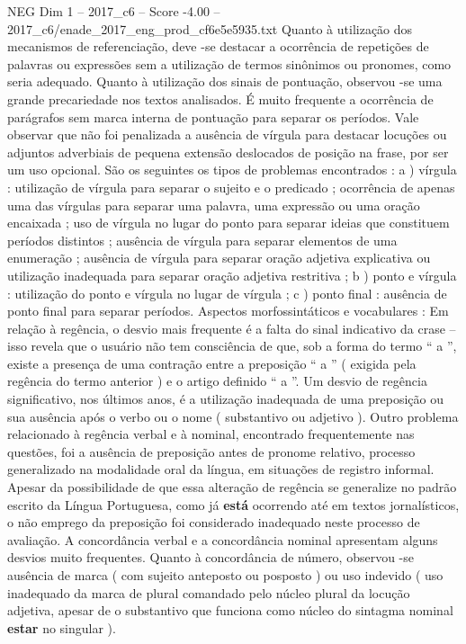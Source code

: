 \begin{textsample}{NEG Dim 1 – 2017\_c6 – Score -4.00 – 2017\_c6/enade\_2017\_eng\_prod\_cf6e5e5935.txt}
Quanto à utilização dos mecanismos de referenciação, deve -se destacar a ocorrência de repetições de palavras ou expressões sem a utilização de termos sinônimos ou pronomes, como seria adequado.
Quanto à utilização dos sinais de pontuação, observou -se uma grande precariedade nos textos analisados.
É muito frequente a ocorrência de parágrafos sem marca interna de pontuação para separar os períodos.
Vale observar que não foi penalizada a ausência de vírgula para destacar locuções ou adjuntos adverbiais de pequena extensão deslocados de posição na frase, por ser um uso opcional.
São os seguintes os tipos de problemas encontrados : a ) vírgula : utilização de vírgula para separar o sujeito e o predicado ; ocorrência de apenas uma das vírgulas para separar uma palavra, uma expressão ou uma oração encaixada ; uso de vírgula no lugar do ponto para separar ideias que constituem períodos distintos ; ausência de vírgula para separar elementos de uma enumeração ; ausência de vírgula para separar oração adjetiva explicativa ou utilização inadequada para separar oração adjetiva restritiva ; b ) ponto e vírgula : utilização do ponto e vírgula no lugar de vírgula ; c ) ponto final : ausência de ponto final para separar períodos.
Aspectos morfossintáticos e vocabulares : Em relação à regência, o desvio mais frequente é a falta do sinal indicativo da crase – isso revela que o usuário não tem consciência de que, sob a forma do termo “ a ”, existe a presença de uma contração entre a preposição “ a ” ( exigida pela regência do termo anterior ) e o artigo definido “ a ”.
Um desvio de regência significativo, nos últimos anos, é a utilização inadequada de uma preposição ou sua ausência após o verbo ou o nome ( substantivo ou adjetivo ).
Outro problema relacionado à regência verbal e à nominal, encontrado frequentemente nas questões, foi a ausência de preposição antes de pronome relativo, processo generalizado na modalidade oral da língua, em situações de registro informal.
Apesar da possibilidade de que essa alteração de regência se generalize no padrão escrito da Língua Portuguesa, como já \textbf{está} ocorrendo até em textos jornalísticos, o não emprego da preposição foi considerado inadequado neste processo de avaliação.
A concordância verbal e a concordância nominal apresentam alguns desvios muito frequentes.
Quanto à concordância de número, observou -se ausência de marca ( com sujeito anteposto ou posposto ) ou uso indevido ( uso inadequado da marca de plural comandado pelo núcleo plural da locução adjetiva, apesar de o substantivo que funciona como núcleo do sintagma nominal \textbf{estar} no singular ).

\end{textsample}
